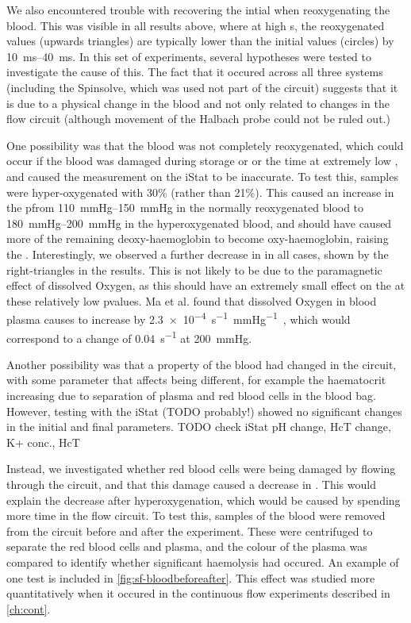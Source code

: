 We also encountered trouble with recovering the intial \Ttwo when reoxygenating the blood.
This was visible in all results above, where at high \SOtwo{}s, the reoxygenated \Ttwo values (upwards triangles)  are typically lower than the initial values (circles) by \SIrange{10}{40}{ms}.
In this set of experiments, several hypotheses were tested to investigate the cause of this.
The fact that it occured across all three systems (including the Spinsolve, which was used not part of the circuit) suggests that it is due to a physical change in the blood and not only related to changes in the flow circuit (although movement of the Halbach probe could not be ruled out.)

One possibility was that the blood was not completely reoxygenated, which could occur if the blood was damaged during storage or or the time at extremely low \SOtwo, and caused the \SOtwo measurement on the iStat to be inaccurate.
To test this, samples were hyper-oxygenated with 30\% \Otwo (rather than 21\%).
This caused an increase in the p\Otwo from \SIrange{110}{150}{mmHg} in the normally reoxygenated blood to \SIrange{180}{200}{mmHg} in the hyperoxygenated blood, and should have caused more of the remaining deoxy-haemoglobin to become oxy-haemoglobin, raising the \Ttwo.
Interestingly, we observed a further decrease in \Ttwo in all cases, shown by the right-triangles in the results.
This is not likely to be due to the paramagnetic effect of dissolved Oxygen, as this should have an extremely small effect on the \Ttwo at these relatively low p\Otwo values.
Ma et al. found that dissolved Oxygen in blood plasma causes \Rtwo to increase by \SI{2.3e-4}{s^{-1}\per\mmHg}~\cite{Maeffectdissolvedoxygen2016}, which would correspond to a change of \SI{0.04}{s^{-1}} at \SI{200}{mmHg}.

Another possibility was that a property of the blood had changed in the circuit, with some parameter that affects \Ttwo being different, for example the haematocrit increasing due to separation of plasma and red blood cells in the blood bag.
However, testing with the iStat (TODO probably!) showed no significant changes in the initial and final parameters.
TODO check iStat pH change, HcT change, K+ conc., HcT

Instead, we investigated whether red blood cells were being damaged by flowing through the circuit, and that this damage caused a decrease in \Ttwo.
This would explain the \Ttwo decrease after hyperoxygenation, which would be caused by spending more time in the flow circuit.
To test this, samples of the blood were removed from the circuit before and after the experiment.
These were centrifuged to separate the red blood cells and plasma, and the colour of the plasma was compared to identify whether significant haemolysis had occured.
An example of one test is included in \autoref{fig:sf-bloodbeforeafter}.
This effect was studied more quantitatively when it occured in the continuous flow experiments described in \autoref{ch:cont}.

